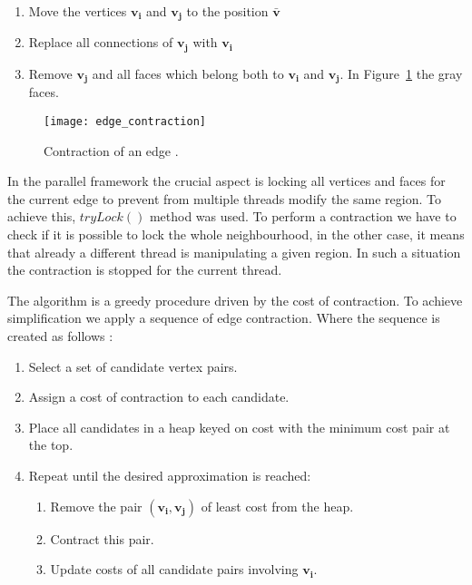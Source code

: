 \begin{enumerate}
\item Move the vertices $\mathbf{v_i}$ and $\mathbf{v_j}$ to the position $\bar{\mathbf{v}}$
\item Replace all connections of $\mathbf{v_j}$ with $\mathbf{v_i}$
\item Remove $\mathbf{v_j}$ and all faces which belong both to $\mathbf{v_i}$ and $\mathbf{v_j}$. In Figure~\ref{fig:edge_contraction_ref} the gray faces.
\end{enumerate}

\begin{figure}[h!]
  \begin{center}
    \texttt{[image: edge\_contraction]}
    \caption{Contraction of an edge \cite{garland99}.}
    \label{fig:edge_contraction_ref}
  \end{center}
\end{figure}

In the parallel framework the crucial aspect is locking all vertices and faces for the current edge to prevent from multiple threads modify the same region. To achieve this, $tryLock()$ method was used. To perform a contraction we have to check if it is possible to lock the whole neighbourhood, in the other case, it means that already a different thread is manipulating a given region. In such a situation the contraction is stopped for the current thread.

The algorithm is a greedy procedure \cite{cormen01} driven by the cost of contraction. To achieve simplification we apply a sequence of edge contraction. Where the sequence is created as follows \cite{garland97}:

\begin{enumerate}
\item Select a set of candidate vertex pairs.
\item Assign a cost of contraction to each candidate.
\item Place all candidates in a heap keyed on cost with the minimum cost pair at the top.
\item Repeat until the desired approximation is reached:
\begin{enumerate}
\item Remove the pair $(\mathbf{v_i}, \mathbf{v_j})$ of least cost from the heap.
\item Contract this pair.
\item Update costs of all candidate pairs involving $\mathbf{v_i}$.
\end{enumerate}
\end{enumerate}

